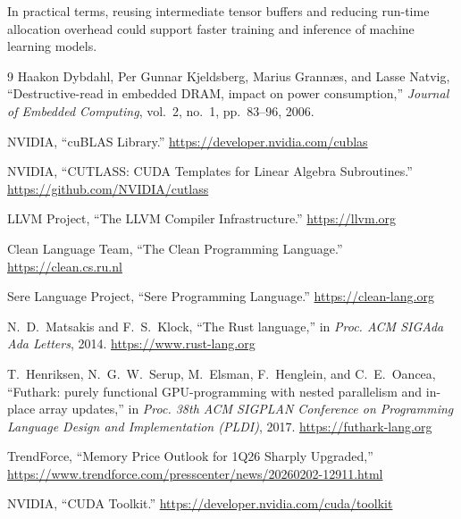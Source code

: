 \documentclass[a4paper]{article}
\begin{document}
	
	In practical terms, reusing intermediate tensor buffers and reducing run-time allocation overhead could support faster training and inference of machine learning models.
	

	\begin{thebibliography}{9}
		Haakon Dybdahl, Per Gunnar Kjeldsberg, Marius Grann{\ae}s, and Lasse Natvig,
		``Destructive-read in embedded DRAM, impact on power consumption,''
		\emph{Journal of Embedded Computing}, vol.~2, no.~1, pp.~83--96, 2006.
		
		NVIDIA, ``cuBLAS Library.'' \url{https://developer.nvidia.com/cublas}
		
		NVIDIA, ``CUTLASS: CUDA Templates for Linear Algebra Subroutines.'' \url{https://github.com/NVIDIA/cutlass}

		LLVM Project, ``The LLVM Compiler Infrastructure.'' \url{https://llvm.org}
		
		Clean Language Team, ``The Clean Programming Language.'' \url{https://clean.cs.ru.nl}
		
		Sere Language Project, ``Sere Programming Language.'' \url{https://clean-lang.org}
		
		N.~D.~Matsakis and F.~S.~Klock, ``The Rust language,'' in \emph{Proc. ACM SIGAda Ada Letters}, 2014. \url{https://www.rust-lang.org}
		
		T.~Henriksen, N.~G.~W.~Serup, M.~Elsman, F.~Henglein, and C.~E.~Oancea, ``Futhark: purely functional GPU-programming with nested parallelism and in-place array updates,'' in \emph{Proc. 38th ACM SIGPLAN Conference on Programming Language Design and Implementation (PLDI)}, 2017. \url{https://futhark-lang.org}
		
		TrendForce, ``Memory Price Outlook for 1Q26 Sharply Upgraded,''
		\url{https://www.trendforce.com/presscenter/news/20260202-12911.html}
		
		NVIDIA, ``CUDA Toolkit.'' \url{https://developer.nvidia.com/cuda/toolkit}

	\end{thebibliography}
	
\end{document}
